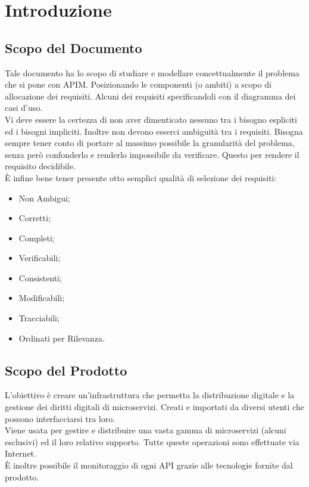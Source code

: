 \documentclass[12pt,a4paper,titlepage]{article}
\begin{document}
	\section{Introduzione}
	\subsection{Scopo del Documento}
	Tale documento ha lo scopo di studiare e modellare concettualmente il problema che si pone con APIM. Posizionando le componenti (o ambiti) a scopo di allocazione dei requisiti. Alcuni dei requisiti specificandoli con il diagramma dei casi d'uso.\\
	Vi deve essere la certezza di non aver dimenticato nessuno tra i bisogno espliciti ed i bisogni impliciti. Inoltre non devono esserci ambiguità tra i requisiti.
	Bisogna sempre tener conto di portare al massimo possibile la granularità del problema, senza però confonderlo e renderlo impossibile da verificare. Questo per rendere il requisito decidibile.\\
	È infine bene tener presente otto semplici qualità di selezione dei requisiti:
	\begin{itemize}
		\item Non Ambigui;
		\item Corretti;
		\item Completi;
		\item Verificabili;
		\item Consistenti;
		\item Modificabili;
		\item Tracciabili;
		\item Ordinati per Rilevanza.
	\end{itemize}
	\subsection{Scopo del Prodotto}
	L'obiettivo è creare un'infrastruttura che permetta la distribuzione digitale e la gestione dei diritti digitali di microservizi. Creati e importati da diversi utenti che possono interfacciarsi tra loro.\\
	Viene usata per gestire e distribuire una vasta gamma di microservizi (alcuni esclusivi) ed il loro relativo supporto. Tutte queste operazioni sono effettuate via Internet.\\
	È inoltre possibile il monitoraggio di ogni API grazie alle tecnologie fornite dal prodotto.\\
	
\end{document}
